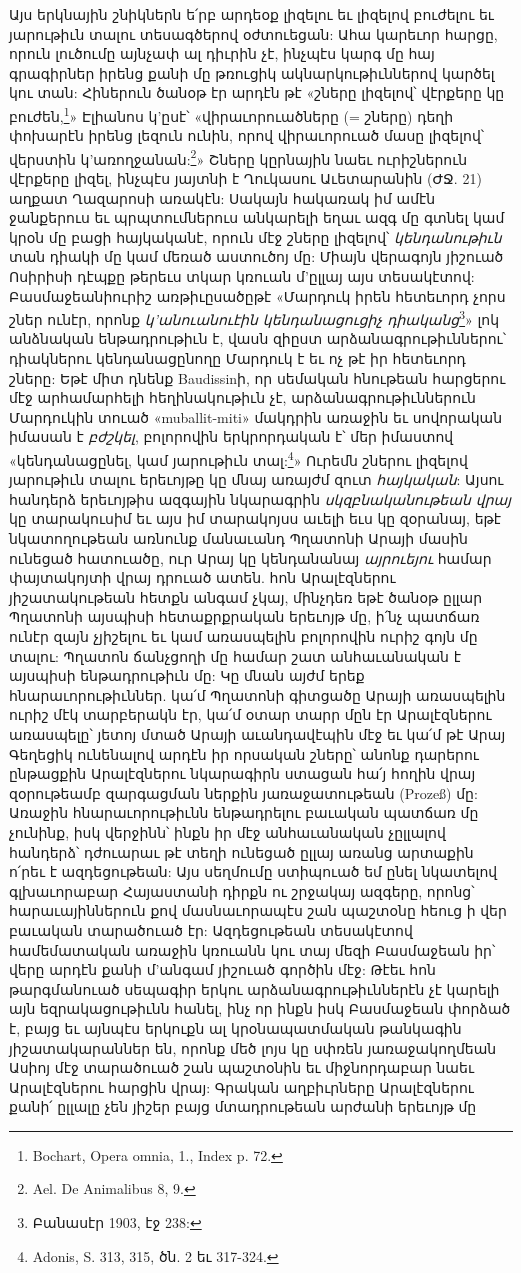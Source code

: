 \documentclass{article}
\begin{document}
{Այս երկնային շնիկներն ե՛րբ արդեօք լիզելու եւ լիզելով բուժելու եւ յարութիւն տալու տեսագծերով օժտուեցան: Ահա կարեւոր հարցը, որուն լուծումը այնչափ ալ դիւրին չէ, ինչպէս կարգ մը հայ գրագիրներ իրենց քանի մը թռուցիկ ակնարկութիւններով կարծել կու տան: Հիներուն ծանօթ էր արդէն թէ «շները լիզելով՝ վէրքերը կը բուժեն,\footnote{Bochart, Opera omnia, 1., Index p. 72.}» Էլիանոս կ'ըսէ՝ «վիրաւորուածները (= շները) դեղի փոխարէն իրենց լեզուն ունին, որով վիրաւորուած մասը լիզելով՝ վերստին կ'առողջանան:\footnote{Ael. De Animalibus 8, 9.}» Շները կըրնային նաեւ ուրիշներուն վէրքերը լիզել, ինչպէս յայտնի է Ղուկասու Աւետարանին (ԺՋ. 21) աղքատ Ղազարոսի առակէն: Սակայն հակառակ իմ ամէն ջանքերուս եւ պրպտումներուս անկարելի եղաւ ազգ մը գտնել կամ կրօն մը բացի հայկականէ, որուն մէջ շները լիզելով՝ \emph{կենդանութիւն} տան դիակի մը կամ մեռած աստուծոյ մը: Միայն վերագոյն յիշուած Ոսիրիսի դէպքը թերեւս տկար կռուան մ'ըլլայ այս տեսակէտով: Բասմաջեանիուրիշ առթիւըսածըթէ «Մարդուկ իրեն հետեւորդ չորս շներ ունէր, որոնք \emph{կ'անուանուէին կենդանացուցիչ դիականց}\footnote{Բանասէր 1903, էջ 238:}» լոկ անձնական ենթադրութիւն է, վասն զիըստ արձանագրութիւններու՝ դիակներու կենդանացընողը Մարդուկ է եւ ոչ թէ իր հետեւորդ շները: Եթէ միտ դնենք Baudissinի, որ սեմական հնութեան հարցերու մէջ արհամարհելի հեղինակութիւն չէ, արձանագրութիւններուն Մարդուկին տուած «muballit-miti» մակդրին առաջին եւ սովորական իմասան է \emph{բժշկել}, բոլորովին երկրորդական է՝ մեր իմաստով «կենդանացընել, կամ յարութիւն տալ:\footnote{Adonis, S. 313, 315, ծն. 2 եւ 317-324.}» Ուրեմն շներու լիզելով յարութիւն տալու երեւոյթը կը մնայ առայժմ զուտ \emph{հայկական}: Այսու հանդերձ երեւոյթիս ազգային նկարագրին \emph{սկզբնականութեան վրայ} կը տարակուսիմ եւ այս իմ տարակոյսս աւելի եւս կը զօրանայ, եթէ նկատողութեան առնունք մանաւանդ Պղատոնի Արայի մասին ունեցած հատուածը, ուր Արայ կը կենդանանայ \emph{այրուեյու} համար փայտակոյտի վրայ դրուած ատեն. հոն Արալէզներու յիշատակութեան հետքն անգամ չկայ, մինչդեռ եթէ ծանօթ ըլլար Պղատոնի այսպիսի հետաքրքրական երեւոյթ մը, ի՛նչ պատճառ ունէր զայն չյիշելու եւ կամ առասպելին բոլորովին ուրիշ գոյն մը տալու: Պղատոն ճանչցողի մը համար շատ անհաւանական է այսպիսի ենթադրութիւն մը: Կը մնան այժմ երեք հնարաւորութիւններ. կա՛մ Պղատոնի գիտցածը Արայի առասպելին ուրիշ մէկ տարբերակն էր, կա՛մ օտար տարր մըն էր Արալէզներու առասպելը՝ յետոյ մտած Արայի աւանդավէպին մէջ եւ կա՛մ թէ Արայ Գեղեցիկ ունենալով արդէն իր որսական շները՝ անոնք դարերու ընթացքին Արալէզներու նկարագիրն ստացան հա՛յ հողին վրայ զօրութեամբ զարգացման ներքին յառաջատութեան (Prozeß) մը: Առաջին հնարաւորութիւնն ենթադրելու բաւական պատճառ մը չունինք, իսկ վերջինն՝ ինքն իր մէջ անհաւանական չըլլալով հանդերձ՝ դժուարաւ թէ տեղի ունեցած ըլլայ առանց արտաքին ո՛րեւ է ազդեցութեան: Այս սեղմումը ստիպուած եմ ընել նկատելով գլխաւորաբար Հայաստանի դիրքն ու շրջակայ ազգերը, որոնց՝ հարաւայիններուն քով մասնաւորապէս շան պաշտօնը հեուց ի վեր բաւական տարածուած էր: Ազդեցութեան տեսակէտով համեմատական առաջին կռուանն կու տայ մեզի Բասմաջեան իր՝ վերը արդէն քանի մ'անգամ յիշուած գործին մէջ: Թէեւ հոն թարգմանուած սեպագիր երկու արձանագրութիւններէն չէ կարելի այն եզրակացութիւնն հանել, ինչ որ ինքն իսկ Բասմաջեան փորձած է, բայց եւ այնպէս երկուքն ալ կրօնապատմական թանկագին յիշատակարաններ են, որոնք մեծ լոյս կը սփռեն յառաջակողմեան Ասիոյ մէջ տարածուած շան պաշտօնին եւ միջնորդաբար նաեւ Արալէզներու հարցին վրայ: Գրական աղբիւրները Արալէզներու քանի՛ ըլլալը չեն յիշեր բայց մտադրութեան արժանի երեւոյթ մը }
\end{document}

